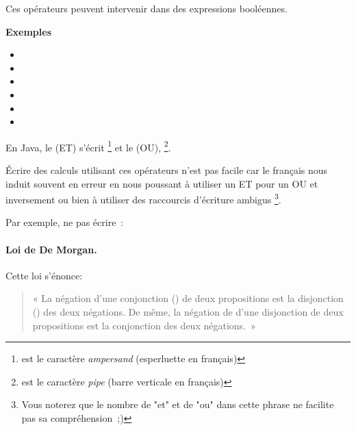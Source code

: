 			Ces opérateurs peuvent intervenir dans des expressions booléennes.

			\textbf{Exemples}
			
			\begin{small}
			\begin{multicols}{2}
				\begin{itemize}
					\item {}
					\item {}
					\item {}
					\item {}
					\item {}
					\item {}
				\end{itemize}
			\end{multicols}
			\end{small}

			En Java, le  (ET) s'écrit \pc{\&\&}
			\footnote{\pc{\&} est le caractère \textit{ampersand} (esperluette 
			en français)}
			et le  (OU), \pc{||}
			\footnote{\pc{|} est le caractère \textit{pipe} (barre verticale 
			en français)}.

	
			Écrire des calculs utilisant ces opérateurs n’est pas facile
			car le français nous induit souvent en erreur
			en nous poussant à utiliser un ET pour un OU et inversement
			ou bien à utiliser des raccourcis d’écriture ambigus%
			\footnote{%
				Vous noterez que le nombre de "et" et de "ou"
				dans cette phrase ne facilite pas sa compréhension~;)%
			}. 
			
			Par exemple, ne pas écrire~: 
	
			\paragraph{Loi de De Morgan.}
				Cette loi s'énonce: 
				\begin{quote}
					{\Huge «}
					La négation d'une conjonction () de deux
					propositions est la disjonction () des deux
					négations. De même, la négation de d'une disjonction de deux
					propositions est la conjonction des deux négations.~{\Huge »}
				\end{quote}

